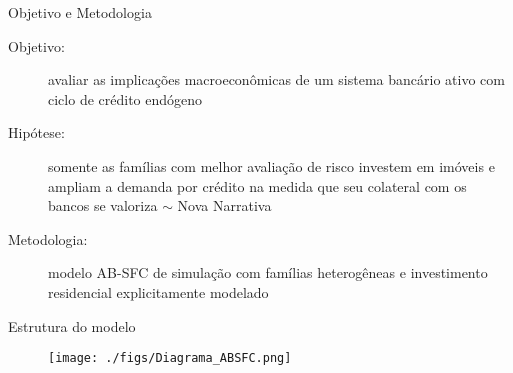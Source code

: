 \begin{frame}{Objetivo e Metodologia}
    
\begin{description}
    \item[Objetivo:]  avaliar as implicações macroeconômicas de um sistema bancário ativo com ciclo de crédito endógeno
\item[Hipótese:] somente as famílias com melhor avaliação de risco investem em imóveis e ampliam a demanda por crédito na medida que seu colateral com os bancos se valoriza $\sim$ Nova Narrativa
    \item[Metodologia:] modelo AB-SFC de simulação com famílias heterogêneas e investimento residencial explicitamente modelado
\end{description}
\end{frame}

\begin{frame}{Estrutura do modelo}

\begin{figure}
    \centering
    \texttt{[image: ./figs/Diagrama\_ABSFC.png]}
\end{figure}
    
\end{frame}